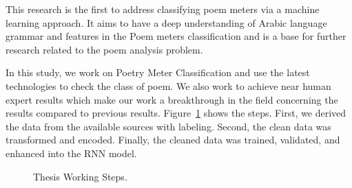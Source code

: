 This research is the first to address classifying poem meters via a machine learning approach. It aims to have a deep understanding of Arabic language grammar and features in the Poem meters classification and is a base for further research related to the poem analysis problem.

In this study, we work on Poetry Meter Classification and use the latest technologies to check the class of poem. We also work to achieve near human expert results which make our work a breakthrough in the field concerning the results compared to previous results. Figure~\ref{Fig:Thesis_Cycle} shows the steps. First, we derived the data from the available sources with labeling. Second, the clean data was transformed and encoded. Finally, the cleaned data was trained, validated, and enhanced into the RNN model.

\begin{figure}[!t]
   
  \caption{Thesis Working Steps.}
  \label{Fig:Thesis_Cycle}
\end{figure}







